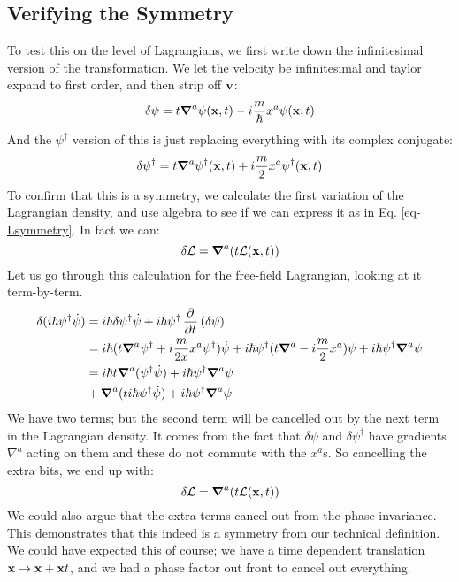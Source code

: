 \subsection{Verifying the Symmetry}
To test this on the level of Lagrangians, we first write down the infinitesimal version of the transformation. We let the velocity be infinitesimal and taylor expand to first order, and then strip off $\mathbf{v}$:
\begin{equation}
    \delta \psi = t\nabla^a \psi(\v{x}, t) - i\frac{m}{\hbar}x^a\psi(\v{x}, t)
\end{equation}
And the $\psi^\dag$ version of this is just replacing everything with its complex conjugate:
\begin{equation}
    \delta \psi^\dag = t\nabla^a \psi^\dag(\v{x}, t) + i\frac{m}{2}x^a\psi^\dag(\v{x}, t)
\end{equation}
To confirm that this is a symmetry, we calculate the first variation of the Lagrangian density, and use algebra to see if we can express it as in Eq. \eqref{eq-Lsymmetry}. In fact we can:
\begin{equation}
    \delta \L = \nabla^a(t\L(\v{x}, t))
\end{equation}
Let us go through this calculation for the free-field Lagrangian, looking at it term-by-term.
\begin{equation}
    \begin{split}
        \delta(i\hbar\psi^\dag\dot{\psi}) &= i\hbar \delta \psi^\dag \dot{\psi} + i\hbar \psi^\dag \dpd{}{t}(\delta \psi)
        \\ &= i\hbar(t \nabla^a \psi^\dag  + i\frac{m}{2x}x^a\psi^\dag)\dot{\psi} + i\hbar\psi^\dag(t\nabla^a - i\frac{m}{2}x^a)\psi + i\hbar \psi^\dag \nabla^a \psi
        \\ &= i\hbar t \nabla^a(\psi^\dag\dot{\psi}) + i\hbar \psi^\dag \nabla^a \psi
        \\ &+ \nabla^a(ti\hbar\psi^\dag\dot{\psi}) + i\hbar\psi^\dag\nabla^a\psi
    \end{split}
\end{equation}
We have two terms; but the second term will be cancelled out by the next term in the Lagrangian density. It comes from the fact that $\delta \psi$ and $\delta \psi^\dag$ have gradients $\nabla^a$ acting on them and these do not commute with the $x^a$s. So cancelling the extra bits, we end up with:
\begin{equation}
    \delta \L = \nabla^a(t\L(\v{x}, t))
\end{equation}
We could also argue that the extra terms cancel out from the phase invariance. This demonstrates that this indeed is a symmetry from our technical definition. We could have expected this of course; we have a time dependent translation $\mathbf{x} \to \mathbf{x} + \mathbf{x}t$, and we had a phase factor out front to cancel out everything.

